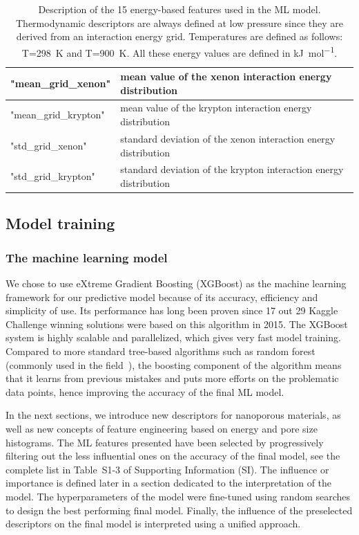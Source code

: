 \documentclass[main]{subfiles}
\begin{document}
\begin{table}[ht]
\begin{tabular}{|l|m{13cm}|}
  \hline
  "mean\_grid\_xenon"  & mean value of the xenon interaction energy distribution \\
  \hline
  "mean\_grid\_krypton"  & mean value of the krypton interaction energy distribution \\
  \hline
  "std\_grid\_xenon"  & standard deviation of the xenon interaction energy distribution \\
  \hline
  "std\_grid\_krypton"  & standard deviation of the krypton interaction energy distribution \\
  \hline
  \end{tabular}
  \caption{Description of the 15 energy-based features used in the ML model. Thermodynamic descriptors are always defined at low pressure since they are derived from an interaction energy grid. Temperatures are defined as follows: T=298~\si{\kelvin} and T=900~\si{\kelvin}. All these energy values are defined in \si{\kilo\joule\per\mole}.}\label{tab:energy_descriptors}
  \end{table}
  
  \clearpage

\subsection{Model training}

\subsubsection{The machine learning model}

We chose to use eXtreme Gradient Boosting (XGBoost) as the machine learning framework for our predictive model because of its accuracy, efficiency and simplicity of use. Its performance has long been proven since 17 out 29 Kaggle Challenge winning solutions were based on this algorithm in 2015. The XGBoost system is highly scalable and parallelized, which gives very fast model training.\autocite{chen2016xgboost} Compared to more standard tree-based algorithms such as random forest (commonly used in the field~\autocite{Simon_2015}), the boosting component of the algorithm means that it learns from previous mistakes and puts more efforts on the problematic data points, hence improving the accuracy of the final ML model.

In the next sections, we introduce new descriptors for nanoporous materials, as well as new concepts of feature engineering based on energy and pore size histograms. The ML features presented have been selected by progressively filtering out the less influential ones on the accuracy of the final model, see the complete list in Table~S1-3 of Supporting Information (SI). The influence or importance is defined later in a section dedicated to the interpretation of the model. The hyperparameters of the model were fine-tuned using random searches to design the best performing final model. Finally, the influence of the preselected descriptors on the final model is interpreted using a unified approach.
\end{document}

